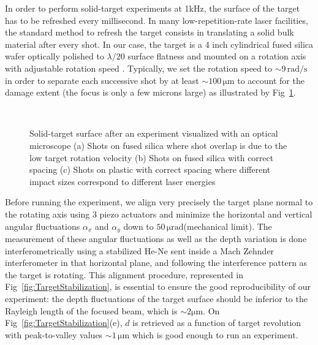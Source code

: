 In order to perform solid-target experiments at 1kHz, the surface of the target has to be refreshed every millisecond. In many low-repetition-rate laser facilities, the standard method to refresh the target consists in translating a solid bulk material after every shot\cite{kahaly2013direct}. In our case, 
the target is a 4 inch cylindrical fused silica wafer optically polished to $\lambda/20$ surface flatness and mounted on a rotation axis with adjustable rotation speed \cite{borot2011high}. Typically, we set the rotation speed to $\sim 9 \,\mathrm{rad/s}$ in order to separate each successive shot by at least $\sim 100\,\mathrm{\mu m}$ to account for the damage extent (the focus is only a few microns large) as illustrated by Fig~\ref{fig:ImpactTarget}.

\begin{figure}[H]
\centering
{}\\
\caption{\label{fig:ImpactTarget} Solid-target surface after an experiment visualized with an optical microscope (a) Shots on fused silica where shot overlap is due to the low target rotation velocity (b) Shots on fused silica with correct spacing
(c) Shots on plastic with correct spacing where different impact sizes correspond to different laser energies}
\end{figure}


\noindent  Before running the experiment, we align very precisely the target plane normal to the rotating axis using 3 piezo actuators and minimize the horizontal and vertical angular fluctuations $\alpha_x$ and $\alpha_y$ down to $50\,\mathrm{\mu rad}$(mechanical limit). The measurement of these angular fluctuations as well as the depth variation is done interferometrically using a stabilized He-Ne sent inside a Mach Zehnder interferometer in that horizontal plane, and following the interference pattern as the target is rotating. This alignment procedure, represented in Fig~\ref{fig:TargetStabilization}, is essential to ensure the good reproducibility of our experiment: the depth fluctuations of the target surface should be inferior to the  Rayleigh length of the focused beam, which is $\sim \mathrm{2\mu m}$. 
On Fig~\ref{fig:TargetStabilization}(e), $d$ is retrieved as a function of target revolution with peak-to-valley values $\sim 1 \,\mathrm{\mu m}$ which is good enough to run an experiment.


